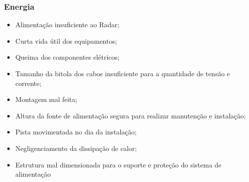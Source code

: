 \subsubsection{Energia}
\begin{itemize}
   \item Alimentação insuficiente ao Radar;
   \item Curta vida útil dos equipamentos; 
   \item Queima dos componentes elétricos;
   \item Tamanho da bitola dos cabos insuficiente para a quantidade de tensão e corrente;
   \item Montagem mal feita;
   \item Altura da fonte de alimentação segura para realizar manutenção e instalação;
   \item Pista movimentada no dia da instalação;
   \item Negligenciamento da dissipação de calor;
   \item Estrutura mal dimensionada para o suporte e proteção do sistema de alimentação
\end{itemize}
